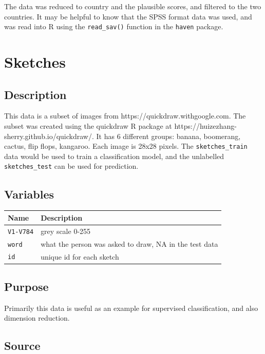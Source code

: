 \documentclass[
  letterpaper,
]{krantz}
\begin{document}
The data was reduced to country and the plausible scores, and filtered
to the two countries. It may be helpful to know that the SPSS format
data was used, and was read into R using the \texttt{read\_sav()}
function in the \texttt{haven} package.

\section{Sketches}\label{sketches}

\subsection*{Description}\label{description-5}

This data is a subset of images from https://quickdraw.withgoogle.com.
The subset was created using the quickdraw R package at
https://huizezhang-sherry.github.io/quickdraw/. It has 6 different
groups: banana, boomerang, cactus, flip flops, kangaroo. Each image is
28x28 pixels. The \texttt{sketches\_train} data would be used to train a
classification model, and the unlabelled \texttt{sketches\_test} can be
used for prediction.

\subsection*{Variables}\label{variables-5}

\begin{longtable}[]{@{}ll@{}}
\toprule\noalign{}
Name & Description \\
\midrule\noalign{}
\endhead
\bottomrule\noalign{}
\endlastfoot
\texttt{V1-V784} & grey scale 0-255 \\
\texttt{word} & what the person was asked to draw, NA in the test
data \\
\texttt{id} & unique id for each sketch \\
\end{longtable}

\subsection*{Purpose}\label{purpose-5}

Primarily this data is useful as an example for supervised
classification, and also dimension reduction.

\subsection*{Source}\label{source-5}
\end{document}
